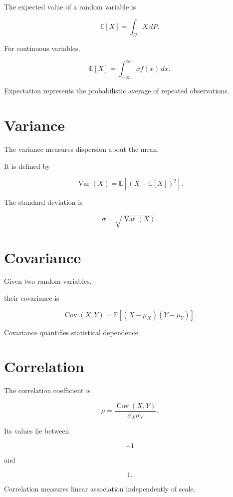 \documentclass[11pt,fleqn]{book}
\numberwithin{equation}{chapter}
\theoremstyle{plain}
\theoremstyle{definition}
\theoremstyle{remark}
\begin{document}
The expected value of a random variable is

\[
\boxed{
\mathbb E[X]
=
\int_\Omega
X\,dP.
}
\]

For continuous variables,

\[
\mathbb E[X]
=
\int_{-\infty}^{\infty}
x
f(x)
\,dx.
\]

Expectation represents the probabilistic average of repeated
observations.


\section{Variance}

The variance measures dispersion about the mean.

It is defined by

\[
\boxed{
\operatorname{Var}(X)
=
\mathbb E
[(X-\mathbb E[X])^2].
}
\]

The standard deviation is

\[
\sigma
=
\sqrt{\operatorname{Var}(X)}.
\]


\section{Covariance}

Given two random variables,

their covariance is

\[
\boxed{
\operatorname{Cov}(X,Y)
=
\mathbb E
[(X-\mu_X)(Y-\mu_Y)].
}
\]

Covariance quantifies statistical dependence.


\section{Correlation}

The correlation coefficient is

\[
\boxed{
\rho
=
\frac{
\operatorname{Cov}(X,Y)
}
{
\sigma_X\sigma_Y
}.
}
\]

Its values lie between

\[
-1
\]

and

\[
1.
\]

Correlation measures linear association independently of scale.
\end{document}

